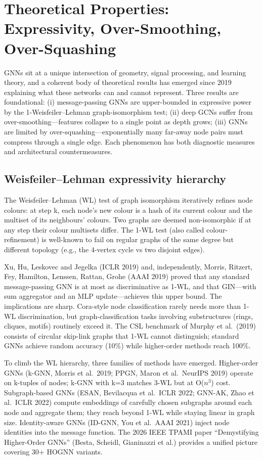 \documentclass{article}
\begin{document}
\section{Theoretical Properties: Expressivity, Over-Smoothing, Over-Squashing}\label{sec:theoretical-properties-expressivity-over-smoothing-over-squa}
GNNs sit at a unique intersection of geometry, signal processing, and learning theory, and a coherent body of theoretical results has emerged since 2019 explaining what these networks can and cannot represent. Three results are foundational: (i) message-passing GNNs are upper-bounded in expressive power by the 1-Weisfeiler--Lehman graph-isomorphism test; (ii) deep GCNs suffer from over-smoothing---features collapse to a single point as depth grows; (iii) GNNs are limited by over-squashing---exponentially many far-away node pairs must compress through a single edge. Each phenomenon has both diagnostic measures and architectural countermeasures.

\subsection{Weisfeiler--Lehman expressivity hierarchy}\label{weisfeilerlehman-expressivity-hierarchy}

The Weisfeiler--Lehman (WL) test of graph isomorphism iteratively refines node colours: at step k, each node's new colour is a hash of its current colour and the multiset of its neighbours' colours. Two graphs are deemed non-isomorphic if at any step their colour multisets differ. The 1-WL test (also called colour-refinement) is well-known to fail on regular graphs of the same degree but different topology (e.g., the 4-vertex cycle vs two disjoint edges).

Xu, Hu, Leskovec and Jegelka (ICLR 2019) and, independently, Morris, Ritzert, Fey, Hamilton, Lenssen, Rattan, Grohe (AAAI 2019) proved that any standard message-passing GNN is at most as discriminative as 1-WL, and that GIN---with sum aggregator and an MLP update---achieves this upper bound. The implications are sharp. Cora-style node classification rarely needs more than 1-WL discrimination, but graph-classification tasks involving substructures (rings, cliques, motifs) routinely exceed it. The CSL benchmark of Murphy et al.~(2019) consists of circular skip-link graphs that 1-WL cannot distinguish; standard GNNs achieve random accuracy (10\%) while higher-order methods reach 100\%.

To climb the WL hierarchy, three families of methods have emerged. Higher-order GNNs (k-GNN, Morris et al.~2019; PPGN, Maron et al.~NeurIPS 2019) operate on k-tuples of nodes; k-GNN with k=3 matches 3-WL but at O(\(n^3\)) cost. Subgraph-based GNNs (ESAN, Bevilacqua et al.~ICLR 2022; GNN-AK, Zhao et al.~ICLR 2022) compute embeddings of carefully chosen subgraphs around each node and aggregate them; they reach beyond 1-WL while staying linear in graph size. Identity-aware GNNs (ID-GNN, You et al.~AAAI 2021) inject node identities into the message function. The 2026 IEEE TPAMI paper ``Demystifying Higher-Order GNNs'' (Besta, Scheidl, Gianinazzi et al.) provides a unified picture covering 30+ HOGNN variants.
\end{document}
